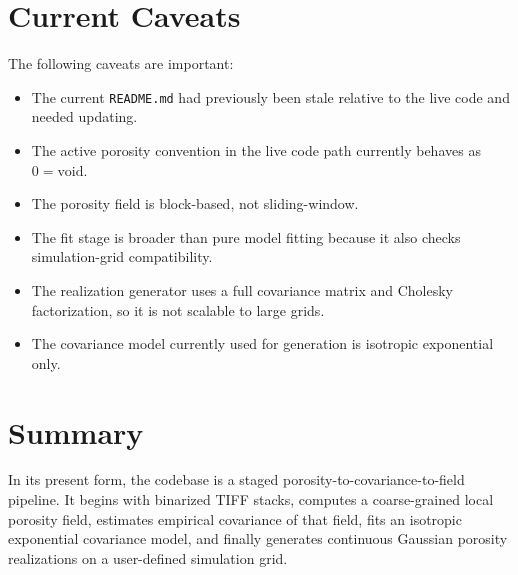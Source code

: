 \documentclass[11pt]{article}
\begin{document}
\section{Current Caveats}
The following caveats are important:
\begin{itemize}
\item The current \texttt{README.md} had previously been stale relative to the
live code and needed updating.
\item The active porosity convention in the live code path currently behaves as
\(0 = \text{void}\).
\item The porosity field is block-based, not sliding-window.
\item The fit stage is broader than pure model fitting because it also checks
simulation-grid compatibility.
\item The realization generator uses a full covariance matrix and Cholesky
factorization, so it is not scalable to large grids.
\item The covariance model currently used for generation is isotropic
exponential only.
\end{itemize}

\section{Summary}
In its present form, the codebase is a staged porosity-to-covariance-to-field
pipeline. It begins with binarized TIFF stacks, computes a coarse-grained local
porosity field, estimates empirical covariance of that field, fits an isotropic
exponential covariance model, and finally generates continuous Gaussian porosity
realizations on a user-defined simulation grid.
\end{document}
